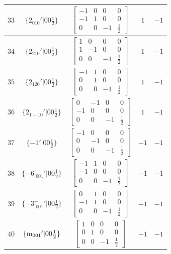 \documentclass[fleqn,8pt]{jsarticle}
\begin{document}
\begin{longtable}{ccccc}
$ 33 $ & $ \{2{}_{010}{}'|0 0 \frac{1}{2}\} $ & $ \begin{bmatrix} -1 & 0 & 0 & 0 \\ -1 & 1 & 0 & 0 \\ 0 & 0 & -1 & \frac{1}{2} \end{bmatrix} $ & $ 1 $ & $ -1 $ \\ \hline
$ 34 $ & $ \{2{}_{210}{}'|0 0 \frac{1}{2}\} $ & $ \begin{bmatrix} 1 & 0 & 0 & 0 \\ 1 & -1 & 0 & 0 \\ 0 & 0 & -1 & \frac{1}{2} \end{bmatrix} $ & $ 1 $ & $ -1 $ \\ \hline
$ 35 $ & $ \{2{}_{120}{}'|0 0 \frac{1}{2}\} $ & $ \begin{bmatrix} -1 & 1 & 0 & 0 \\ 0 & 1 & 0 & 0 \\ 0 & 0 & -1 & \frac{1}{2} \end{bmatrix} $ & $ 1 $ & $ -1 $ \\ \hline
$ 36 $ & $ \{2{}_{1-10}{}'|0 0 \frac{1}{2}\} $ & $ \begin{bmatrix} 0 & -1 & 0 & 0 \\ -1 & 0 & 0 & 0 \\ 0 & 0 & -1 & \frac{1}{2} \end{bmatrix} $ & $ 1 $ & $ -1 $ \\ \hline
$ 37 $ & $ \{-1{}'|0 0 \frac{1}{2}\} $ & $ \begin{bmatrix} -1 & 0 & 0 & 0 \\ 0 & -1 & 0 & 0 \\ 0 & 0 & -1 & \frac{1}{2} \end{bmatrix} $ & $ -1 $ & $ -1 $ \\ \hline
$ 38 $ & $ \{-6^{+}_{\,\,001}{}'|0 0 \frac{1}{2}\} $ & $ \begin{bmatrix} -1 & 1 & 0 & 0 \\ -1 & 0 & 0 & 0 \\ 0 & 0 & -1 & \frac{1}{2} \end{bmatrix} $ & $ -1 $ & $ -1 $ \\ \hline
$ 39 $ & $ \{-3^{+}_{\,\,001}{}'|0 0 \frac{1}{2}\} $ & $ \begin{bmatrix} 0 & 1 & 0 & 0 \\ -1 & 1 & 0 & 0 \\ 0 & 0 & -1 & \frac{1}{2} \end{bmatrix} $ & $ -1 $ & $ -1 $ \\ \hline
$ 40 $ & $ \{{\rm m}_{001}{}'|0 0 \frac{1}{2}\} $ & $ \begin{bmatrix} 1 & 0 & 0 & 0 \\ 0 & 1 & 0 & 0 \\ 0 & 0 & -1 & \frac{1}{2} \end{bmatrix} $ & $ -1 $ & $ -1 $ \\ \hline

\end{longtable}
\end{document}
